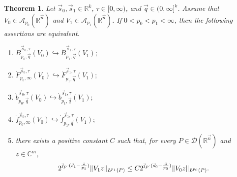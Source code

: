 \documentclass[11pt, reqno]{amsart}
\newtheorem{theorem}{Theorem}[section]
\theoremstyle{definition}
\theoremstyle{remark}
\numberwithin{equation}{section}
\newcommand{\A}{\mathscr A}
\newcommand{\R}{\mathbb R}
\newcommand{\vj}{\vec{\textit{\j}}}
\newcommand{\vq}{\vec q}
\newcommand{\aveL}{\textit{\L}}
\begin{document}
\begin{theorem} \label{thm-sobolev-B}
Let $\vec s_0,\vec s_1\in\R^k$, $\tau\in[0,\infty)$, and $\vq\in(0,\infty]^k$.
Assume that $V_0\in \A_{p_0}(\mathbb R^{\vec n})$ and $V_1\in \A_{p_1}(\mathbb R^{\vec n})$.
If $0<p_0< p_1<\infty$, then the following assertions are equivalent.
\begin{enumerate}[\rm(i)]
\item\label{it:Sob-i}
$
\dot{B}_{p_0,\vq}^{\vec s_0,\tau}(V_0)
\hookrightarrow \dot{B}_{p_1,\vq}^{\vec s_1,\tau}(V_1);
$

\item\label{it:Sob-ii}
$
\dot{F}_{p_0,\infty}^{\vec s_0,\tau}(V_0)
\hookrightarrow \dot{F}_{p_1,\vq}^{\vec s_1,\tau}(V_1);
$

\item\label{it:Sob-iii}
$
\dot{b}_{p_0,\vq}^{\vec s_0,\tau}(V_0)
\hookrightarrow \dot{b}_{p_1,\vq}^{\vec s_1,\tau}(V_1);
$

\item\label{it:Sob-iv}
$
\dot{f}_{p_0,\infty}^{\vec s_0,\tau}(V_0)
\hookrightarrow \dot{f}_{p_1,\vq}^{\vec s_1,\tau}(V_1);
$

\item\label{it:Sob-v} there exists a positive constant $C$
such that, for every $P\in\mathscr D(\mathbb R^{\vec n})$ and $z\in\mathbb{C}^{m}$,
\begin{align}\label{eq-sobolev-B}
  2^{\vj_P \cdot (\vec s_1-\frac{\vec n}{p_1})}\|V_1 z\|_{\aveL^{p_1}(P)}
  \leq C 2^{\vj_P \cdot (\vec s_0-\frac{\vec n}{p_0})} \|V_0 z\|_{\aveL^{p_0}(P)}.
\end{align}
\end{enumerate}
\end{theorem}
\end{document}
